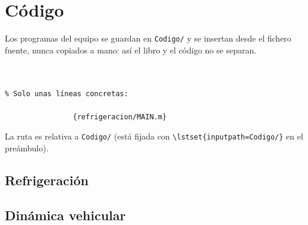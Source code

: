 \chapter{Código}
\label{ch:codigo}

Los programas del equipo se guardan en \texttt{Codigo/} y se insertan desde el
fichero fuente, nunca copiados a mano: así el libro y el código no se separan.

\begin{verbatim}


% Solo unas líneas concretas:

                {refrigeracion/MAIN.m}
\end{verbatim}

\noindent
La ruta es relativa a \texttt{Codigo/} (está fijada con
\verb|\lstset{inputpath=Codigo/}| en el preámbulo).

\section{Refrigeración}
\label{sec:codigo_refrigeracion}

\section{Dinámica vehicular}
\label{sec:codigo_dinamica}

